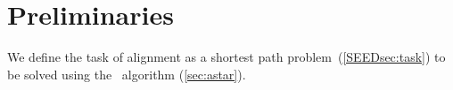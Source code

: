 \section{Preliminaries} \label{sec:prereq}

We define the task of alignment as a shortest path problem~(\cref{SEEDsec:task}) to
be solved using the \A~algorithm (\cref{sec:astar}).
%



